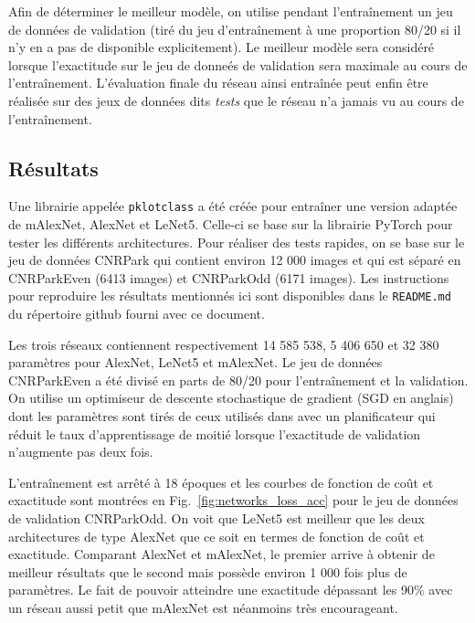 \documentclass[12pt]{article}
\begin{document}
Afin de déterminer le meilleur modèle, on utilise pendant l'entraînement un jeu de données de validation (tiré du jeu d'entraînement à une proportion 80/20 si il n'y en a pas de disponible explicitement). Le meilleur modèle sera considéré lorsque l'exactitude sur le jeu de donneés de validation sera maximale au cours de l'entraînement. L'évaluation finale du réseau ainsi entraînée peut enfin être réalisée sur des jeux de données dits \textit{tests} que le réseau n'a jamais vu au cours de l'entraînement.

\subsection*{Résultats}

Une librairie appelée \texttt{pklotclass} a été créée pour entraîner une version adaptée de mAlexNet, AlexNet et LeNet5. Celle-ci se base sur la librairie PyTorch \citep{pytorch} pour tester les différents architectures. Pour réaliser des tests rapides, on se base sur le jeu de données CNRPark \citep{Amato2017} qui contient environ 12 000 images et qui est séparé en CNRParkEven (6413 images) et CNRParkOdd (6171 images). Les instructions pour reproduire les résultats mentionnés ici sont disponibles dans le \texttt{README.md} du répertoire github fourni avec ce document.

Les trois réseaux contiennent respectivement 14 585 538, 5 406 650 et 32 380 paramètres pour AlexNet, LeNet5 et mAlexNet. Le jeu de données CNRParkEven a été divisé en parts de 80/20 pour l'entraînement et la validation. On utilise un optimiseur de descente stochastique de gradient (SGD en anglais) dont les paramètres sont tirés de ceux utilisés dans \cite{Amato2017} avec un planificateur qui réduit le taux d'apprentissage de moitié lorsque l'exactitude de validation n'augmente pas deux fois.

L'entraînement est arrêté à 18 époques et les courbes de fonction de coût et exactitude sont montrées en Fig.~\ref{fig:networks_loss_acc} pour le jeu de données de validation CNRParkOdd. On voit que LeNet5 est meilleur que les deux architectures de type AlexNet que ce soit en termes de fonction de coût et exactitude. Comparant AlexNet et mAlexNet, le premier arrive à obtenir de meilleur résultats que le second mais possède environ 1 000 fois plus de paramètres. Le fait de pouvoir atteindre une exactitude dépassant les 90\% avec un réseau aussi petit que mAlexNet est néanmoins très encourageant.
\end{document}
